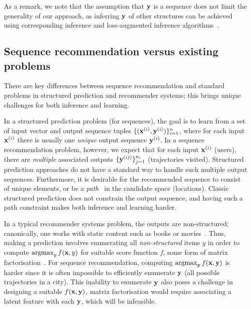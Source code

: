 As a remark, we note that the assumption that $\mathbf{y}$ is a sequence does not limit the generality of our approach,
as inferring $\mathbf{y}$ of other structures can be achieved using corresponding inference and loss-augmented inference algorithms~\cite{joachims2009predicting}.  %


\subsection{Sequence recommendation versus existing problems}

There are key differences between sequence recommendation and %
standard problems in structured prediction and recommender systems;
this brings unique challenges for both inference and learning.

In a structured prediction problem (for sequences), the goal is to learn from a set of
input vector and output sequence tuples
$\{ (\mathbf{x}^{({i})}, \mathbf{y}^{({i})}) \}_{i = 1}^n$, where
for each input $\mathbf{x}^{({i})}$ there is usually one \emph{unique} output sequence $\mathbf{y}^{({i})}$.
In a sequence recommendation problem, however, we expect that %
for each input $\mathbf{x}^{({i})}$ (\eg users),
there are \emph{multiple} associated outputs
$\{ \mathbf{y}^{({ij})} \}_{j=1}^{n_i}$ (\eg trajectories visited).
Structured prediction approaches do not have a standard way to handle such multiple output sequences.
Furthermore, it is desirable for the recommended sequence to consist of unique elements,
or be a {\em path}~\cite{west2001introduction} in the candidate space (\eg locations).
Classic structured prediction does not constrain the output sequence, and having such a
path constraint makes both inference and learning harder.

In a typical recommender systems problem, the outputs are non-structured; canonically, one works with {static} content such as books or movies~\citep{Goldberg:1992,Sarwar:2001,Netflix}.
Thus, making a prediction involves enumerating all {\em non-structured} items $y$ in order to compute $\operatorname*{argmax}_y f(\mathbf{x},y)$ for suitable score function $f$, \eg some form of matrix factorisation~\citep{Koren:2009}.
For sequence recommendation, computing $\operatorname*{argmax}_{\mathbf{y}} f(\mathbf{x},\mathbf{y})$ is harder since it is often impossible to efficiently enumerate $\mathbf{y}$ (\eg all possible trajectories in a city).
This inability to enumerate $\mathbf{y}$ also poses a challenge in designing a suitable $f(\mathbf{x},\mathbf{y})$,
\eg
matrix factorisation
would require associating a latent feature with each $\mathbf{y}$, which will be infeasible.


